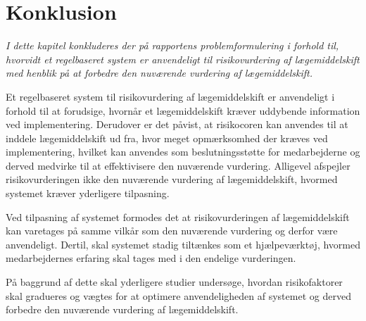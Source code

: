 %

\chapter{Konklusion}
\textit{I dette kapitel konkluderes der på rapportens problemformulering i forhold til, hvorvidt et regelbaseret system er anvendeligt til risikovurdering af lægemiddelskift med henblik på at forbedre den nuværende vurdering af lægemiddelskift.}

Et regelbaseret system til risikovurdering af lægemiddelskift er anvendeligt i forhold til at forudsige, hvornår et lægemiddelskift kræver uddybende information ved implementering. Derudover er det påvist, at risikocoren kan anvendes til at inddele lægemiddelskift ud fra, hvor meget opmærksomhed der kræves ved implementering, hvilket kan anvendes som beslutningsstøtte for medarbejderne og derved medvirke til at effektivisere den nuværende vurdering.
Alligevel afspejler risikovurderingen ikke den nuværende vurdering af lægemiddelskift, hvormed systemet kræver yderligere tilpasning.

Ved tilpasning af systemet formodes det at risikovurderingen af lægemiddelskift kan varetages på samme vilkår som den nuværende vurdering og derfor være anvendeligt. Dertil, skal systemet stadig tiltænkes som et hjælpeværktøj, hvormed medarbejdernes erfaring skal tages med i den endelige vurderingen. 

På baggrund af dette skal yderligere studier undersøge, hvordan risikofaktorer skal gradueres og vægtes for at optimere anvendeligheden af systemet og derved
forbedre den nuværende vurdering af lægemiddelskift.
